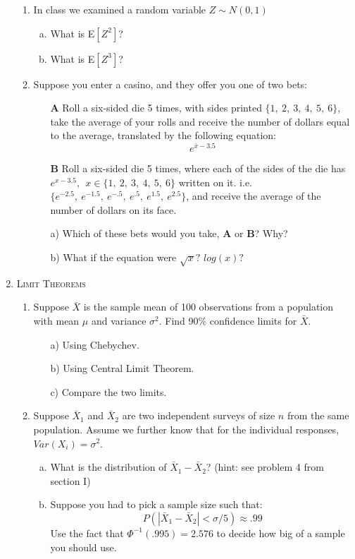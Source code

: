 \documentclass[11pt,letterpaper]{article}
\numberwithin{equation}{section}
\begin{document}
\begin{enumerate}[I]
\begin{enumerate}[1)]
\item In class we examined a random variable $Z\sim N(0,1)$ 
\begin{enumerate}[a)]
\item What is E$[Z^2]$?
\item What is E$[Z^3]$?
\end{enumerate}

\item Suppose you enter a casino, and they offer you one of two bets:

\begin{enumerate}
\item[\textbf{A}] Roll a six-sided die 5 times, with sides printed $\{1,\ 2,\ 3,\ 4,\ 5,\ 6\}$, take the average of your rolls and receive the number of dollars equal to the average, translated by the following equation:
$$e^{\bar{x}-3.5}$$
\item[\textbf{B}] Roll a six-sided die 5 times, where each of the sides of the die has $e^{x-3.5},\ \ x\in\{1,\ 2,\ 3,\ 4,\ 5,\ 6\}$ written on it.  i.e. $\{e^{-2.5},\ e^{-1.5},\ e^{-.5},\ e^{.5},\ e^{1.5},\ e^{2.5}\}$, and receive the average of the number of dollars on its face.
\end{enumerate}
\begin{enumerate}
\item[a)]  Which of these bets would you take, \textbf{A} or \textbf{B}?  Why?

\item[b)] What if the equation were  $\sqrt{x}?$ $log(x)?$
\end{enumerate}
\end{enumerate}


\item \textsc{Limit Theorems} 

\begin{enumerate}[1)]

\item Suppose $\bar{X}$ is the sample mean of 100 observations from a population with mean $\mu$ and variance $\sigma^2$.  Find 90\% confidence limits for $\bar{X}$.
\begin{enumerate}
\item[a)] Using Chebychev.
\item[b)] Using Central Limit Theorem.
\item[c)] Compare the two limits.
\end{enumerate}

\item Suppose $\bar{X}_1$ and $\bar{X}_2$ are two independent surveys of size $n$ from the same population.  Assume we further know that for the individual responses, $Var(X_i)=\sigma^2$.
\begin{enumerate}[a)]
\item What is the distribution of $\bar{X}_1-\bar{X}_2$? (hint: see problem 4 from section I)
\item Suppose you had to pick a sample size such that: $$P(|\bar{X}_1-\bar{X}_2| < \sigma/5) \approx .99$$
 Use the fact that $\Phi^{-1}(.995)=2.576$ to decide how big of a sample you should use.
\end{enumerate}



\end{enumerate}
\end{enumerate}
\end{document}
